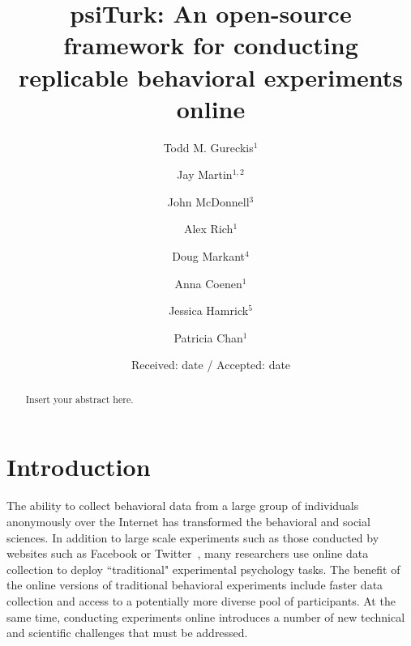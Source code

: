 \documentclass[twocolumn]{svjour3}          %
\begin{document}
\title{\textsf{psiTurk}: An open-source framework for conducting replicable behavioral experiments online}

\author{Todd M. Gureckis$^1$ \and
	Jay Martin$^{1,2}$ \and
	John McDonnell$^3$ \and
	Alex Rich$^1$ \and
	Doug Markant$^4$  \and
	Anna Coenen$^1$ \and
	Jessica Hamrick$^5$ \and
	Patricia Chan$^1$
}




\date{Received: date / Accepted: date}

\maketitle

\begin{abstract}
Insert your abstract here.
\end{abstract}


\section{Introduction}


The ability to collect behavioral data from a large group of individuals
anonymously over the Internet has transformed the behavioral and social
sciences.  In addition to large scale experiments such as those
conducted by websites such as Facebook or 
Twitter~\citep[e.g.,][]{Chen:2013pb,Kramer:2014dq,Wu:2011sp}, many researchers
use online data collection to deploy ``traditional" experimental psychology
tasks.  The benefit of the online versions of traditional behavioral experiments include 
faster data collection and access to a potentially more diverse pool of participants. 
At the same time, conducting experiments online introduces a number of new 
technical and scientific challenges that must be addressed.
\end{document}

